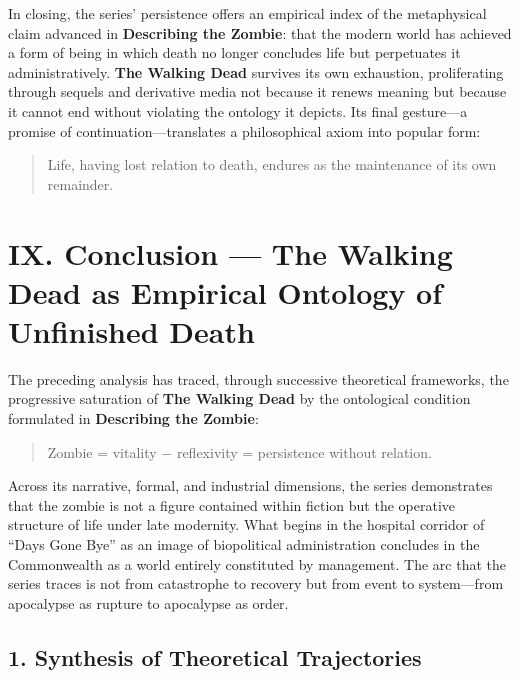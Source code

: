 \documentclass[11pt]{article}
\begin{document}
In closing, the series’ persistence offers an empirical index of the metaphysical claim advanced in \textbf{Describing the Zombie}: that the modern world has achieved a form of being in which death no longer concludes life but perpetuates it administratively.  \textbf{The Walking Dead} survives its own exhaustion, proliferating through sequels and derivative media not because it renews meaning but because it cannot end without violating the ontology it depicts.  Its final gesture—a promise of continuation—translates a philosophical axiom into popular form:

\begin{quote}
Life, having lost relation to death, endures as the maintenance of its own remainder.
\end{quote}
\section*{IX. Conclusion — The Walking Dead as Empirical Ontology of Unfinished Death}
\label{sec:org1e64f1c}

The preceding analysis has traced, through successive theoretical frameworks, the progressive saturation of \textbf{The Walking Dead} by the ontological condition formulated in \textbf{Describing the Zombie}:

\begin{quote}
Zombie = vitality − reflexivity = persistence without relation.
\end{quote}

Across its narrative, formal, and industrial dimensions, the series demonstrates that the zombie is not a figure contained within fiction but the operative structure of life under late modernity.  What begins in the hospital corridor of “Days Gone Bye” as an image of biopolitical administration concludes in the Commonwealth as a world entirely constituted by management.  The arc that the series traces is not from catastrophe to recovery but from event to system—from apocalypse as rupture to apocalypse as order.
\subsection*{1. Synthesis of Theoretical Trajectories}
\label{sec:org15531d4}
\end{document}
